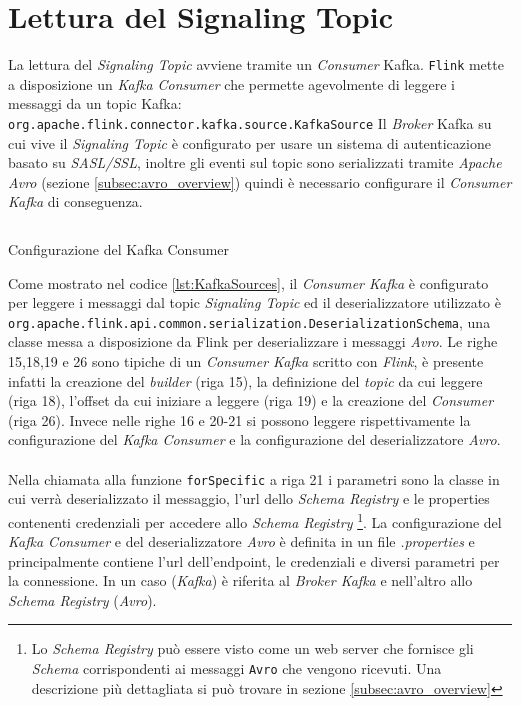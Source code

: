 \section{Lettura del Signaling Topic}
\label{sec:LetturaDelSignalingTopic}
La lettura del \textit{Signaling Topic} avviene tramite un \textit{Consumer} Kafka.
\texttt{Flink} mette a disposizione un \textit{Kafka Consumer} che permette agevolmente di leggere i messaggi da un topic Kafka: \texttt{org.apache.flink.connector.kafka.source.KafkaSource}
Il \textit{Broker} Kafka su cui vive il \textit{Signaling Topic} è configurato per usare un sistema di autenticazione basato su \textit{SASL/SSL},
inoltre gli eventi sul topic sono serializzati tramite \textit{Apache Avro} (sezione \ref{subsec:avro_overview}) quindi è necessario configurare il \textit{Consumer Kafka} di conseguenza.
\begin{code}
    \inputminted[linenos]{java}{listings/EventsExport/KafkaSources.java}
    \caption{Configurazione del Kafka Consumer}
    \label{lst:KafkaSources}
\end{code}
Come mostrato nel codice \ref{lst:KafkaSources}, il \textit{Consumer Kafka} è configurato per leggere i messaggi dal topic \textit{Signaling Topic} 
ed il deserializzatore utilizzato è\\ \texttt{org.apache.flink.api.common.serialization.DeserializationSchema},
una classe messa a disposizione da Flink per deserializzare i messaggi \textit{Avro}.
Le righe 15,18,19 e 26 sono tipiche di un \textit{Consumer Kafka} scritto con \textit{Flink}, è presente infatti la creazione del \textit{builder} (riga 15),
la definizione del \textit{topic} da cui leggere (riga 18), l'offset da cui iniziare a leggere (riga 19) e  la creazione del \textit{Consumer} (riga 26).
Invece nelle righe 16 e 20-21 si possono leggere rispettivamente la configurazione del \textit{Kafka Consumer} e la configurazione del deserializzatore \textit{Avro}.\\\\
Nella chiamata alla funzione \texttt{forSpecific} a riga 21 i parametri sono la classe in cui verrà deserializzato il messaggio, l'url dello \textit{Schema Registry}
e le properties contenenti credenziali per accedere allo \textit{Schema Registry} \footnote{Lo \textit{Schema Registry} può essere visto come un web server che fornisce
gli \textit{Schema} corrispondenti ai messaggi \texttt{Avro} che vengono ricevuti. Una descrizione più dettagliata si può trovare in sezione \ref{subsec:avro_overview}}. 
La configurazione del \textit{Kafka Consumer} e del deserializzatore \textit{Avro} è definita in un file \textit{.properties} e principalmente contiene
l'url dell'endpoint, le credenziali e diversi parametri per la connessione.
In un caso (\textit{Kafka}) è riferita al \textit{Broker Kafka} e nell'altro allo \textit{Schema Registry} (\textit{Avro}).
